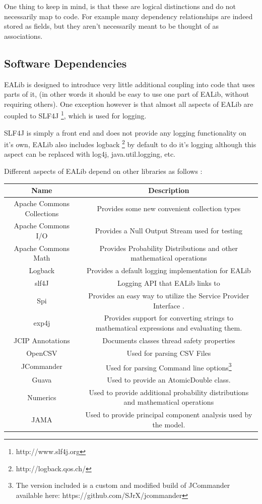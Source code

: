 \documentclass[11pt,letterpaper,oneside]{article}
\begin{document}
\vspace{5pt}
One thing to keep in mind, is that these are logical distinctions and do not necessarily map to code. For example many dependency relationships are indeed stored as fields, but they aren't necessarily meant to be thought of as associations.

\subsection{Software Dependencies}

EALib is designed to introduce very little additional coupling into code that uses parts of it, (in other words it should be easy to use one part of EALib, without requiring others). One exception however is that almost all aspects of EALib are coupled to SLF4J \footnote{http://www.slf4j.org}, which is used for logging.

SLF4J is simply a front end and does not provide any logging functionality on it's own, EALib also includes logback \footnote{http://logback.qos.ch/} by default to do it's logging although this aspect can be replaced with log4j, java.util.logging, etc.


Different aspects of EALib depend on other libraries as follows :
\\

\begin{minipage}{12cm}
\begin{tabular}{c c }
Name & Description  \\

\hline
\hline
Apache Commons Collections & Provides some new convenient collection types \\
Apache Commons I/O & Provides a Null Output Stream used for testing \\
Apache Commons Math & Provides Probability Distributions and other mathematical operations \\
Logback & 	Provides a default logging implementation for EALib \\
slf4J & Logging API that EALib links to \\
Spi & Provides an easy way to utilize the Service Provider Interface . \\
exp4j & Provides support for converting strings to mathematical expressions and evaluating them. \\
JCIP Annotations & Documents classes thread safety properties \\
OpenCSV & Used for parsing CSV Files \\
JCommander & Used for parsing Command line options\footnote{The version included is a custom and modified build of JCommander available here: https://github.com/SJrX/jcommander} \\
Guava & Used to provide an AtomicDouble class. \\ 
Numerics & Used to provide additional probability distributions and mathematical operations \\
JAMA & Used to provide principal component analysis used by the model. \\


\end{tabular}
\end{minipage}
\end{document}

